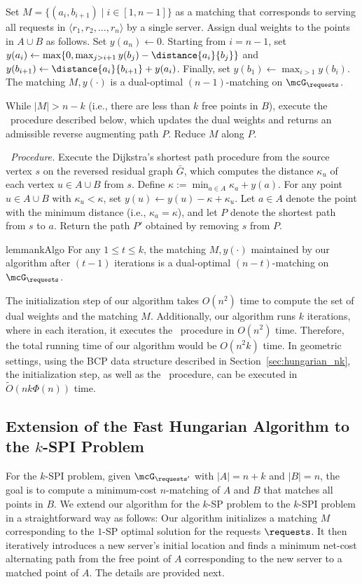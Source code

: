  Set $M= \{(a_i, b_{i+1})\mid i\in[1, n-1]\}$ as a matching that corresponds to serving all requests in $\langle r_1, r_2,\ldots, r_n\rangle$ by a single server. Assign dual weights to the points in $A\cup B$ as follows. Set $y(a_n)\leftarrow 0$. Starting from $i=n-1$, set $y(a_{i})\leftarrow\max\{0, \max_{j>i+1}y(b_j)-\distance{a_{i}}{b_j}\}$ and $y(b_{i+1})\leftarrow\distance{a_{i}}{b_{i+1}} + y(a_{i})$. Finally, set $y(b_1)\leftarrow \max_{i>1}y(b_i)$. The matching $M, y(\cdot)$ is a dual-optimal $(n-1)$-matching on $\mcG_\requests$.


While $|M|>n-k$ (i.e., there are less than $k$ free points in $B$), execute the \reverse\ procedure described below, which updates the dual weights and returns an admissible reverse augmenting path $P$. Reduce $M$ along $P$. 

{\it \reverse\ Procedure.} Execute the Dijkstra's shortest path procedure from the source vertex $s$ on the reversed residual graph $\bar{G}$, which computes the distance $\kappa_u$ of each vertex $u\in A\cup B$ from $s$. Define $\kappa:=\min_{a\in A} \kappa_a + y(a)$. For any point $u\in A\cup B$ with $\kappa_u<\kappa$, set $y(u)\leftarrow y(u)-\kappa+\kappa_u$. Let $a\in A$ denote the point with the minimum distance (i.e., $\kappa_a=\kappa$), and let $P$ denote the shortest path from $s$ to $a$. Return the path $P'$ obtained by removing $s$ from $P$.




\begin{restatable}{lemma}{nkAlgo}\label{lemma:nkAlgo}
    For any $1\le t\le k$, the matching $M, y(\cdot)$ maintained by our algorithm after $(t-1)$ iterations is a dual-optimal $(n-t)$-matching on $\mcG_\requests$.
\end{restatable}


The initialization step of our algorithm takes $O(n^2)$ time to compute the set of dual weights and the matching $M$. Additionally, our algorithm runs $k$ iterations, where in each iteration, it executes the \reverse\ procedure in $O(n^2)$ time. Therefore, the total running time of our algorithm would be $O(n^2k)$ time. In geometric settings, using the BCP data structure described in Section~\ref{sec:hungarian_nk}, the initialization step, as well as the \reverse\ procedure, can be executed in $\tilde{O}(nk\Phi(n))$ time.


\subsection{Extension of the Fast Hungarian Algorithm to the \texorpdfstring{$k$}{}-SPI Problem} 
For the $k$-SPI problem, given $\mcG_{\requests'}$ with $|A|=n+k$ and $|B|=n$, the goal is to compute a minimum-cost $n$-matching of $A$ and $B$ that matches all points in $B$. We extend our algorithm for the $k$-SP problem to the $k$-SPI problem in a straightforward way as follows: Our algorithm initializes a matching $M$ corresponding to the $1$-SP optimal solution for the requests $\requests$. It then iteratively introduces a new server's initial location and finds a minimum net-cost alternating path from the free point of $A$ corresponding to the new server to a matched point of $A$. The details are provided next.

